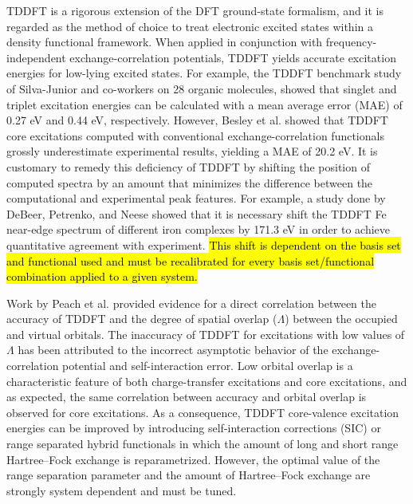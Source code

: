 \documentclass[12pt]{article}
\begin{document}
TDDFT is a rigorous extension of the DFT ground-state formalism,\cite{runge_density-functional_1984} and it is regarded as the method of choice to treat electronic excited states within a density functional framework.
 When applied in conjunction with frequency-independent exchange-correlation potentials, TDDFT yields accurate excitation energies for low-lying excited states. For example, the TDDFT benchmark study of Silva-Junior and co-workers\cite{silva-junior_benchmarks_2008} on 28 organic molecules, showed that singlet and triplet excitation energies can be calculated with a mean average error (MAE) of 0.27 eV and 0.44 eV, respectively. However, Besley et al.\cite{besley_self-consistent-field_2009} showed that TDDFT core excitations computed with conventional exchange-correlation functionals grossly underestimate experimental results, yielding a MAE of 20.2 eV. It is customary to remedy this deficiency of TDDFT by shifting the position of computed spectra by an amount that minimizes the difference between the computational and experimental peak features. For example, a study done by DeBeer, Petrenko, and Neese\cite{debeer_george_prediction_2008} showed that it is necessary shift the TDDFT Fe near-edge spectrum of different iron complexes by 171.3 eV in order to achieve quantitative agreement with experiment. \hl{This shift is dependent on the basis set and functional used and must be recalibrated for every basis set/functional combination applied to a given system.}

Work by Peach et al.\cite{peach_excitation_2008} provided evidence for a direct correlation between the accuracy of TDDFT and the degree of spatial overlap ($\Lambda$) between the occupied and virtual orbitals.
The inaccuracy of TDDFT for excitations with low values of $\Lambda$ has been attributed to the incorrect asymptotic behavior of the exchange-correlation potential and self-interaction error.\cite{peach_excitation_2008} Low orbital overlap is a characteristic feature of both charge-transfer excitations and core excitations, and as expected, the same correlation between accuracy and orbital overlap is observed for core excitations.\cite{besley_time-dependent_2009}
As a consequence, TDDFT core-valence excitation energies can be improved by introducing self-interaction corrections (SIC)\cite{tu_core_2007} or range separated hybrid functionals in which the amount of long and short range Hartree--Fock exchange is reparametrized.\cite{besley_time-dependent_2009, nakata_time-dependent_2006}  However, the optimal value of the range separation parameter and the amount of Hartree--Fock exchange are strongly system dependent and must be tuned.\cite{capano_role_2013,besley_time-dependent_2007,besley_time-dependent_2010}
\end{document}
